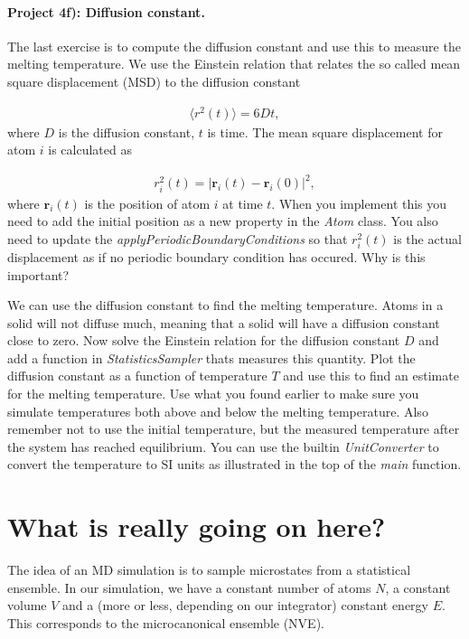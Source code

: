 \documentclass[%
oneside,                 %
final,                   %
10pt]{article}
\begin{document}
\paragraph{Project 4f): Diffusion constant.}
The last exercise is to compute the diffusion constant and use this to measure the melting temperature. We use the Einstein relation that relates the so called mean square displacement (MSD) to the diffusion constant

\begin{align}
	\langle r^2(t) \rangle = 6Dt,
\end{align}
where $D$ is the diffusion constant, $t$ is time. The mean square displacement for atom $i$ is calculated as

\begin{align}
	r_i^2(t) = |\mathbf{r}_i(t) - \mathbf{r}_i(0)|^2,
\end{align}
where $\mathbf{r}_i(t)$ is the position of atom $i$ at time $t$. When you implement this you need to add the initial position as a new property in the \emph{Atom} class. You also need to update the \emph{applyPeriodicBoundaryConditions} so that $r_i^2(t)$ is the actual displacement as if no periodic boundary condition has occured. Why is this important?

We can use the diffusion constant to find the melting temperature. Atoms in a solid will not diffuse much, meaning that a solid will have a diffusion constant close to zero. Now solve the Einstein relation for the diffusion constant $D$ and add a function in \emph{StatisticsSampler} thats measures this quantity. Plot the diffusion constant as a function of temperature $T$ and use this to find an estimate for the melting temperature. Use what you found earlier  to make sure you simulate temperatures both above and below the melting temperature. Also remember not to use the initial temperature, but the measured temperature after the system has reached equilibrium. You can use the builtin \emph{UnitConverter} to convert the temperature to SI units as illustrated in the top of the \emph{main} function. 


\section{What is really going on here?}
The idea of an MD simulation is to sample microstates from a statistical ensemble. In our simulation, we have a constant number of atoms $N$, a constant volume $V$ and a (more or less, depending on our integrator) constant energy $E$. This corresponds to the microcanonical ensemble (NVE). 
\end{document}
